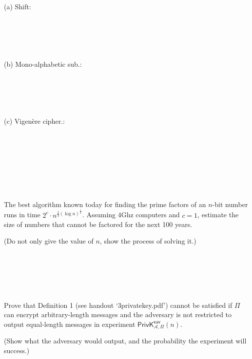 \documentclass[12pt,letterpaper,boxed]{amspset}
\begin{document}
\begin{solution}
(a) Shift:\\
\\
\\
\\
\\
\\
(b) Mono-alphabetic sub.:\\
\\
\\
\\
\\
\\
(c) Vigen\`{e}re cipher.:\\
\\
\\
\\
\\
\\
\\
\\
\end{solution}

\begin{problem}[3.1]
The best algorithm known today for finding the prime factors of an $n$-bit number runs in time $2^c\cdot n ^ {\frac{1}{3}(\log n)^{\frac{1}{3}}}$. Assuming 4Ghz computers and $c=1$, estimate the size of numbers that cannot be factored for the next 100 years.
\end{problem}

\begin{solution}
(Do not only give the value of $n$, show the process of solving it.)\\
\\
\\
\\
\\
\\
\end{solution}

\begin{problem}[3.2]
Prove that Definition 1 (see handout `3privatekey.pdf') cannot be satisfied if $\Pi$ can encrypt arbitrary-length messages and the adversary is not restricted to output equal-length messages in experiment $\mathsf{PrivK}^{\mathsf{eav}}_{\mathcal{A},\Pi}(n)$.
\end{problem}

\begin{solution}
(Show what the adversary would output, and the probability the experiment will success.)
\\
\\
\\
\\
\\
\\
\\
\end{solution}
\end{document}

